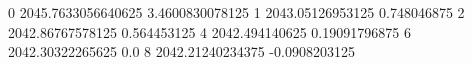 0 2045.7633056640625 3.4600830078125
1 2043.05126953125 0.748046875
2 2042.86767578125 0.564453125
4 2042.494140625 0.19091796875
6 2042.30322265625 0.0
8 2042.21240234375 -0.0908203125
